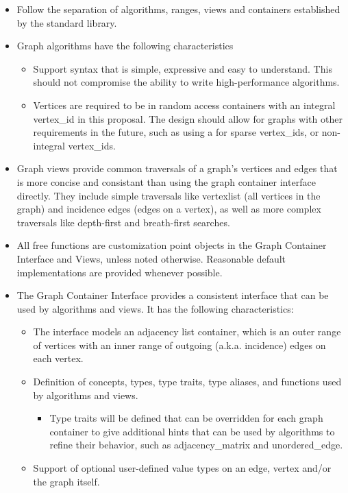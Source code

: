 \begin{itemize}
  \item Follow the separation of algorithms, ranges, views and containers established by the standard library.
  \item Graph algorithms have the following characteristics
  \begin{itemize}
    \item Support syntax that is simple, expressive and easy to understand. This should not compromise the ability to write high-performance algorithms.
    \item Vertices are required to be in random access containers with an integral vertex\_id in this proposal. The design should allow for graphs
          with other requirements in the future, such as using a  for sparse vertex\_ids, or non-integral vertex\_ids.
  \end{itemize}
  \item Graph views provide common traversals of a graph's vertices and edges that is more concise and consistant than using the graph container interface directly. They include simple traversals like vertexlist (all vertices in the graph) and incidence edges (edges on a vertex), as well as more complex traversals like depth-first and breath-first searches.
  \item All free functions are customization point objects in the Graph Container Interface and Views, unless noted otherwise. Reasonable default implementations are provided whenever possible.
  \item The Graph Container Interface provides a consistent interface that can be used by algorithms and views. It has the following characteristics:
  \begin{itemize}
    \item The interface models an adjacency list container, which is an outer range of vertices with an inner range of outgoing (a.k.a. incidence) edges on each vertex.
    \item Definition of concepts, types, type traits, type aliases, and functions used by algorithms and views.
    \begin{itemize}
      \item Type traits will be defined that can be overridden for each graph container to give additional hints that can be used by algorithms to refine their behavior, such as adjacency\_matrix and unordered\_edge.
    \end{itemize}
    \item Support of optional user-defined value types on an edge, vertex and/or the graph itself.

\end{itemize}
\end{itemize}
